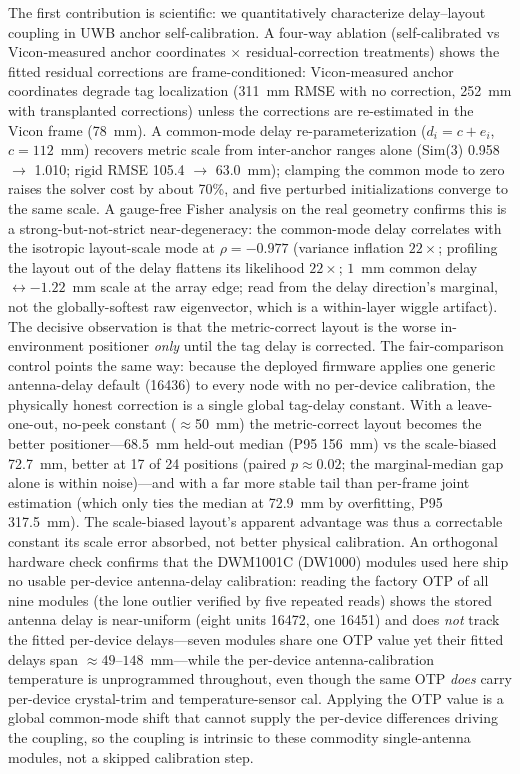 \documentclass[10pt,a4paper]{article}
\begin{document}
The first contribution is scientific: we quantitatively characterize delay--layout coupling in UWB anchor self-calibration. A four-way ablation (self-calibrated vs Vicon-measured anchor coordinates $\times$ residual-correction treatments) shows the fitted residual corrections are frame-conditioned: Vicon-measured anchor coordinates degrade tag localization (311~mm RMSE with no correction, 252~mm with transplanted corrections) unless the corrections are re-estimated in the Vicon frame (78~mm). A common-mode delay re-parameterization ($d_i = c + e_i$, $c = 112$~mm) recovers metric scale from inter-anchor ranges alone (Sim(3) 0.958 $\to$ 1.010; rigid RMSE 105.4 $\to$ 63.0~mm); clamping the common mode to zero raises the solver cost by about 70\%, and five perturbed initializations converge to the same scale. A gauge-free Fisher analysis on the real geometry confirms this is a strong-but-not-strict near-degeneracy: the common-mode delay correlates with the isotropic layout-scale mode at $\rho=-0.977$ (variance inflation $22\times$; profiling the layout out of the delay flattens its likelihood $22\times$; $1$~mm common delay $\leftrightarrow -1.22$~mm scale at the array edge; read from the delay direction's marginal, not the globally-softest raw eigenvector, which is a within-layer wiggle artifact). The decisive observation is that the metric-correct layout is the worse in-environment positioner \emph{only} until the tag delay is corrected. The fair-comparison control points the same way: because the deployed firmware applies one generic antenna-delay default (16436) to every node with no per-device calibration, the physically honest correction is a single global tag-delay constant. With a leave-one-out, no-peek constant ($\approx$50~mm) the metric-correct layout becomes the better positioner---68.5~mm held-out median (P95 156~mm) vs the scale-biased 72.7~mm, better at 17 of 24 positions (paired $p\approx0.02$; the marginal-median gap alone is within noise)---and with a far more stable tail than per-frame joint estimation (which only ties the median at 72.9~mm by overfitting, P95 317.5~mm). The scale-biased layout's apparent advantage was thus a correctable constant its scale error absorbed, not better physical calibration. An orthogonal hardware check confirms that the DWM1001C (DW1000) modules used here ship no usable per-device antenna-delay calibration: reading the factory OTP of all nine modules (the lone outlier verified by five repeated reads) shows the stored antenna delay is near-uniform (eight units 16472, one 16451) and does \emph{not} track the fitted per-device delays---seven modules share one OTP value yet their fitted delays span $\approx 49$--$148$~mm---while the per-device antenna-calibration temperature is unprogrammed throughout, even though the same OTP \emph{does} carry per-device crystal-trim and temperature-sensor cal. Applying the OTP value is a global common-mode shift that cannot supply the per-device differences driving the coupling, so the coupling is intrinsic to these commodity single-antenna modules, not a skipped calibration step.
\end{document}
